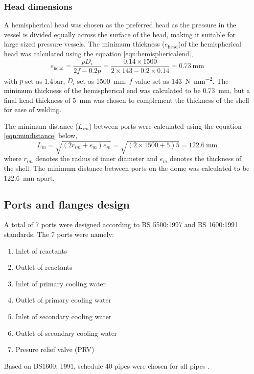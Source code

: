 \subsubsection{Head dimensions}
A hemispherical head was chosen as the preferred head as the pressure in the vessel is divided equally across the surface of the head, making it suitable for large sized pressure vessels. The minimum thickness ($e_\mathrm{head}$)of the hemispherical head was calculated using the equation \ref{eqn:hemisphericalend},
\begin{equation}
    e_\mathrm{head} = \frac{pD_i}{2f-0.2p} = \frac{0.14 \times 1500}{2 \times 143 - 0.2 \times 0.14} = \SI{0.73}{\mm}
    \label{eqn:hemisphericalend}
\end{equation}
with $p$ set as 1.4bar, $D_i$ set as \SI{1500}{\milli \metre}, $f$ value set as \SI{143}{\N\per\square\mm}.  The minimum thickness of the hemispherical end was calculated to be \SI{0.73}{\milli \metre}, but a final head thickness of \SI{5}{\milli \metre} was chosen to complement the thickness of the shell for ease of welding. 

The minimum distance ($L_{im}$) between ports were calculated using the equation \ref{eqn:mindistance} below,
\begin{equation}
    L_m = \sqrt{(2r_{im}+e_{m})e_m} = \sqrt{(2 \times 1500 + 5)5} = \SI{122.6}{\mm}
    \label{eqn:mindistance}
\end{equation}
where $r_{im}$ denotes the radius of inner diameter and $e_m$ denotes the thickness of the shell. The minimum distance between ports on the dome was calculated to be \SI{122.6}{\milli \metre} apart. 

\subsection{Ports and flanges design}
A total of 7 ports were designed according to BS 5500:1997 and BS 1600:1991 standards. The 7 ports were namely:
\begin{enumerate}
    \item Inlet of reactants
    \item Outlet of reactants
    \item Inlet of primary cooling water
    \item Outlet of primary cooling water
    \item Inlet of secondary cooling water
    \item Outlet of secondary cooling water
    \item Presure relief valve (PRV)
\end{enumerate}
Based on BS1600: 1991, schedule 40 pipes were chosen for all pipes \cite{noauthor_dimensions_nodate}. 
